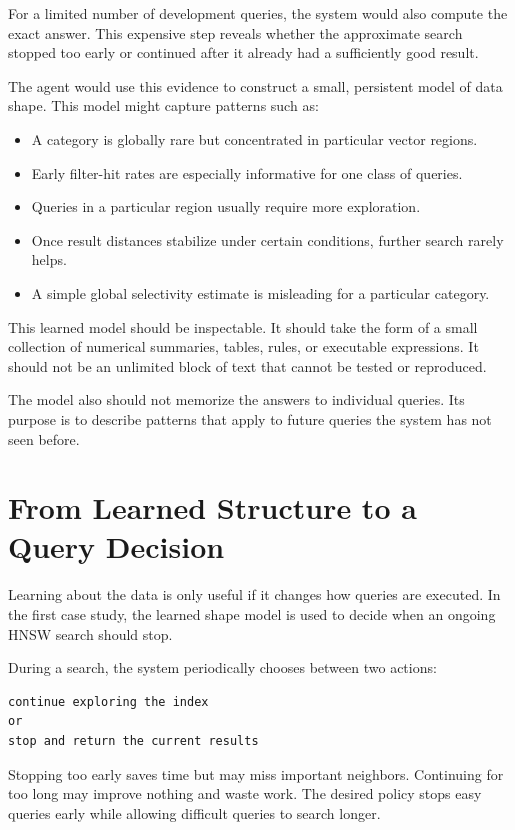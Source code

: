 \documentclass[11pt]{article}
\begin{document}
For a limited number of development queries, the system would also compute the exact answer. This expensive step reveals whether the approximate search stopped too early or continued after it already had a sufficiently good result.

The agent would use this evidence to construct a small, persistent model of data shape. This model might capture patterns such as:

\begin{itemize}
    \item A category is globally rare but concentrated in particular vector regions.
    \item Early filter-hit rates are especially informative for one class of queries.
    \item Queries in a particular region usually require more exploration.
    \item Once result distances stabilize under certain conditions, further search rarely helps.
    \item A simple global selectivity estimate is misleading for a particular category.
\end{itemize}

This learned model should be inspectable. It should take the form of a small collection of numerical summaries, tables, rules, or executable expressions. It should not be an unlimited block of text that cannot be tested or reproduced.

The model also should not memorize the answers to individual queries. Its purpose is to describe patterns that apply to future queries the system has not seen before.

\section{From Learned Structure to a Query Decision}

Learning about the data is only useful if it changes how queries are executed. In the first case study, the learned shape model is used to decide when an ongoing HNSW search should stop.

During a search, the system periodically chooses between two actions:

\begin{verbatim}
continue exploring the index
or
stop and return the current results
\end{verbatim}

Stopping too early saves time but may miss important neighbors. Continuing for too long may improve nothing and waste work. The desired policy stops easy queries early while allowing difficult queries to search longer.
\end{document}
